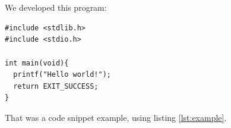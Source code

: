 \chapter{\codename}
We developed this program:

\begin{listing}[H]
\begin{verbatim}
#include <stdlib.h>
#include <stdio.h>

int main(void){
  printf("Hello world!");
  return EXIT_SUCCESS;
}
\end{verbatim}
\caption{Code that says "Hello world!"}
\label{lst:example}
\end{listing}

That was a code snippet example, using listing \ref{lst:example}.
